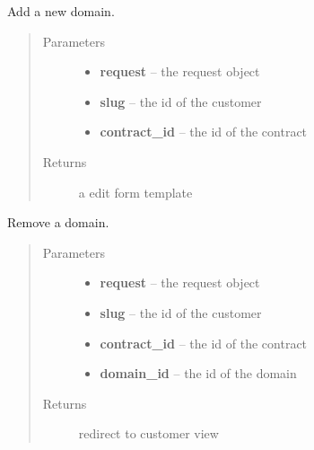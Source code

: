 \documentclass[letterpaper,10pt,english]{sphinxmanual}
\begin{document}
\begin{fulllineitems}
\label{api/system:limeade.system.views.domain_add}
Add a new domain.
\begin{quote}\begin{description}
\item[{Parameters}] \leavevmode\begin{itemize}
\item {} 
\textbf{request} -- the request object

\item {} 
\textbf{slug} -- the id of the customer

\item {} 
\textbf{contract\_id} -- the id of the contract

\end{itemize}

\item[{Returns}] \leavevmode
a edit form template

\end{description}\end{quote}

\end{fulllineitems}


\begin{fulllineitems}
\label{api/system:limeade.system.views.domain_delete}
Remove a domain.
\begin{quote}\begin{description}
\item[{Parameters}] \leavevmode\begin{itemize}
\item {} 
\textbf{request} -- the request object

\item {} 
\textbf{slug} -- the id of the customer

\item {} 
\textbf{contract\_id} -- the id of the contract

\item {} 
\textbf{domain\_id} -- the id of the domain

\end{itemize}

\item[{Returns}] \leavevmode
redirect to customer view

\end{description}\end{quote}

\end{fulllineitems}
\end{document}

